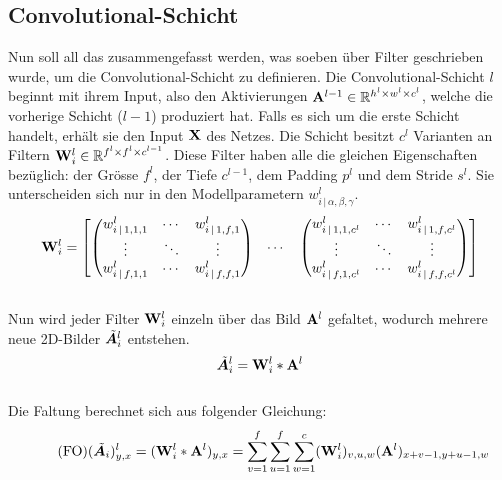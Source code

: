 \subsection{Convolutional-Schicht}
Nun soll all das zusammengefasst werden, was soeben über Filter geschrieben
wurde, um die Convolutional-Schicht zu definieren.
\para{}
Die Convolutional-Schicht $l$ beginnt mit ihrem Input, also den
Aktivierungen $\mathbf{A}^{l-1} \in \mathbb{R}^{h^l \times w^l \times c^l}$, welche die vorherige Schicht ($l-1$) produziert hat.
Falls es sich um die erste Schicht handelt, erhält sie den Input $\mathbf{X}$ des Netzes.
\para{}
Die Schicht besitzt $c^l$ Varianten an Filtern $\mathbf{W}^l_i \in
\mathbb{R}^{f^l \times f^l \times c^{l-1}}$. Diese Filter haben alle die gleichen
Eigenschaften bezüglich: der Grösse $f^l$, der Tiefe $c^{l-1}$, dem Padding
$p^l$ und dem Stride $s^l$. Sie unterscheiden sich nur in den Modellparametern
$w^l_{i\,|\,\alpha,\beta,\gamma}$.
\\
\begin{equation*}
  \mathbf{W}^l_i =
  \begin{bmatrix}
    \begin{pmatrix}
      w_{i\,|\,1,1,1}^l & \cdots & w_{i\,|\,1,f,1}^l \\
      \vdots & \ddots & \vdots \\
      w_{i\,|\,f,1,1}^l & \cdots & w_{i\,|\,f,f,1}^l
    \end{pmatrix}
    & \cdots &
    \begin{pmatrix}
      w_{i\,|\,1,1,c^l}^l & \cdots & w_{i\,|\,1,f,c^l}^l \\
      \vdots & \ddots & \vdots \\
      w_{i\,|\,f,1,c^l}^l & \cdots & w_{i\,|\,f,f,c^l}^l
    \end{pmatrix}
  \end{bmatrix}
\end{equation*}
\\
Nun wird jeder Filter $\mathbf{W}_i^l$ einzeln über das Bild
$\mathbf{A}^l$ gefaltet, wodurch mehrere neue 2D-Bilder $\tilde{\bm{A}}_i^l$ entstehen.
\\
\begin{equation}
  \tilde{\bm{A}}_i^l = \mathbf{W}_i^l * \mathbf{A}^l
\end{equation}
\\
Die Faltung berechnet sich aus folgender Gleichung:
\\
\begin{equation}\tag{FO}
  (\tilde{\bm{A}}_i)_{y,x}^l = (\mathbf{W}_i^l * \mathbf{A}^l)_{y,x} = \sum_{v=1}^{f} \sum_{u=1}^{f} \sum_{w=1}^c (\mathbf{W}^l_i)_{v,u,w} (\mathbf{A}^l)_{x+v-1,y+u-1,w}
\end{equation}
